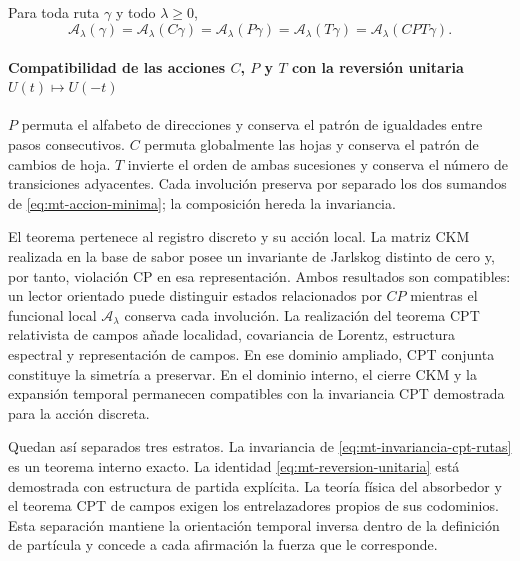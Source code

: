 \begin{resultado}[title={Teorema: Invariancia discreta individual y conjunta}]
\label{thm:mt-cpt-rutas}
Para toda ruta $\gamma$ y todo $\lambda\geq0$,
\begin{equation}
 \mathcal A_\lambda(\gamma)
 =\mathcal A_\lambda(C\gamma)
 =\mathcal A_\lambda(P\gamma)
 =\mathcal A_\lambda(T\gamma)
 =\mathcal A_\lambda(CPT\gamma).
 \label{eq:mt-invariancia-cpt-rutas}
\end{equation}
\end{resultado}

\paragraph{Compatibilidad de las acciones \(C\), \(P\) y \(T\) con la reversión unitaria \(U(t)\mapsto U(-t)\)}
$P$ permuta el alfabeto de direcciones y conserva el patrón de igualdades
entre pasos consecutivos. $C$ permuta globalmente las hojas y conserva el
patrón de cambios de hoja. $T$ invierte el orden de ambas sucesiones y
conserva el número de transiciones adyacentes. Cada involución preserva por
separado los dos sumandos de
\eqref{eq:mt-accion-minima}; la composición hereda la invariancia.


El teorema pertenece al registro discreto y su acción local. La matriz CKM
realizada en la base de sabor posee un invariante de Jarlskog distinto de
cero y, por tanto, violación CP en esa representación. Ambos resultados son
compatibles: un lector orientado puede distinguir estados relacionados por
$CP$ mientras el funcional local
$\mathcal A_\lambda$ conserva cada involución. La
realización del teorema CPT relativista de campos añade localidad,
covariancia de Lorentz, estructura espectral y representación de campos. En
ese dominio ampliado, CPT conjunta constituye la simetría a preservar. En el
dominio interno, el cierre CKM y la expansión temporal permanecen compatibles
con la invariancia CPT demostrada para la acción discreta.

Quedan así separados tres estratos. La invariancia de
\eqref{eq:mt-invariancia-cpt-rutas} es un teorema interno exacto. La identidad
\eqref{eq:mt-reversion-unitaria} está demostrada con estructura de partida
explícita. La teoría física del absorbedor y el teorema CPT de campos exigen
los entrelazadores propios de sus codominios. Esta separación mantiene la
orientación temporal inversa dentro de la definición de partícula y concede
a cada afirmación la fuerza que le corresponde.
